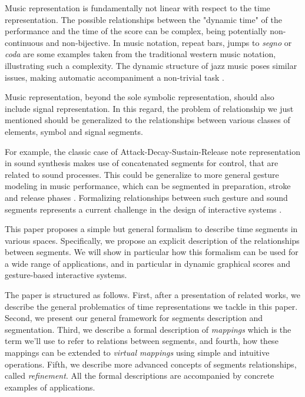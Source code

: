\documentclass[letterpaper, 12pt]{article}
\newcommand{\vdmapping}		{virtual mapping}
\newcommand{\vdmapping}		{continuous mapping}
\begin{document}
Music representation is  fundamentally not linear with respect to the time representation. The  possible relationships between the "dynamic time" of the performance and the time of the score can be complex, being potentially non-continuous and non-bijective. In music notation, repeat bars, jumps to \emph{segno} or \emph{coda} are some examples taken from the traditional western music notation, illustrating such a complexity. The dynamic  structure of jazz music poses similar issues, making automatic accompaniment a non-trivial task \cite{Gold2011,liang2011}.



Music representation, beyond the sole symbolic representation, should also include signal representation. In this regard, the problem of relationship we just mentioned should be generalized to the relationships between various classes of elements, symbol and signal segments. 

For example, the classic case of Attack-Decay-Sustain-Release note representation in sound synthesis makes use of concatenated segments for control, that are related to sound processes. This could be generalize to more general gesture modeling in music performance, which can be segmented in preparation, stroke and release phases \cite{Francoise12a}. Formalizing relationships between such gesture and sound segments represents a current challenge in the design of interactive systems \cite{Bevilacqua2011Springer, Rasamimanana_OS09}. 

This paper proposes a simple but general formalism to describe time segments in various spaces. Specifically, we propose an explicit description of the relationships between segments. We will show in particular how this formalism can be used for a wide range of applications, and in particular in dynamic graphical scores and gesture-based interactive systems.

The paper is structured as follows. First, after a presentation of  related works, we describe the general problematics of time representations we tackle in this paper.  Second, we present our general framework for segments description and segmentation. Third, we describe a formal description of \emph{mappings} which is the term we'll use to refer to relations between segments, and fourth, how these mappings can be extended to \emph{\vdmapping s} using simple and intuitive operations. Fifth, we describe more advanced concepts of segments relationships, called \emph{refinement}. All the formal descriptions are accompanied by concrete examples of applications.
\end{document}
